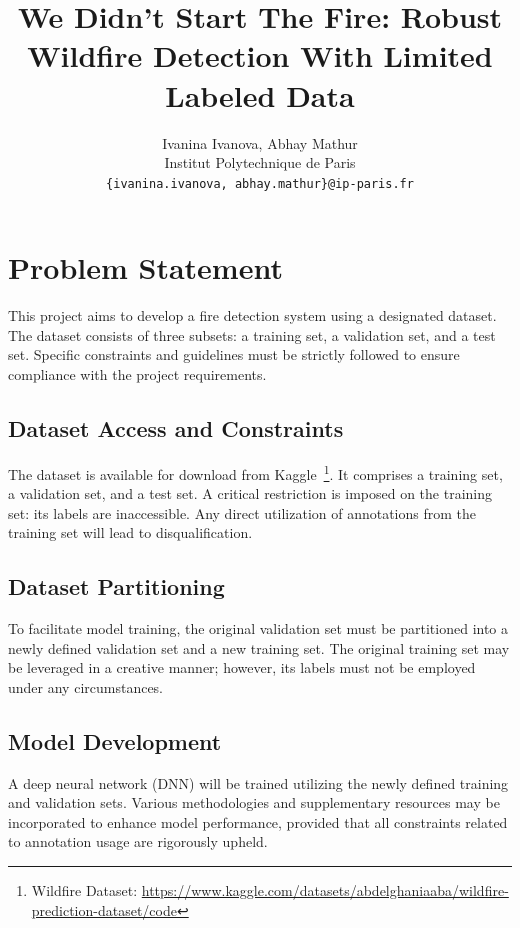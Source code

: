 \documentclass{article}
\title{We Didn't Start The Fire: Robust Wildfire Detection With Limited Labeled Data}
\author{
  Ivanina Ivanova, Abhay Mathur \\
  Institut Polytechnique de Paris \\
  \texttt{\{ivanina.ivanova, abhay.mathur\}@ip-paris.fr} \\
}
\begin{document}
\maketitle

\begin{abstract}
\end{abstract}

\section{Problem Statement}
This project aims to develop a fire detection system using a designated
dataset. The dataset consists of three subsets: a training set, a validation
set, and a test set. Specific constraints and guidelines must be strictly
followed to ensure compliance with the project requirements.

\subsection{Dataset Access and Constraints}

The dataset is available for download from Kaggle~\footnote{Wildfire Dataset:
  \url{https://www.kaggle.com/datasets/abdelghaniaaba/wildfire-prediction-dataset/code}}.
It comprises a training set, a validation set, and a test set. A critical
restriction is imposed on the training set: its labels are inaccessible. Any
direct utilization of annotations from the training set will lead to
disqualification.

\subsection{Dataset Partitioning}

To facilitate model training, the original validation set must be partitioned
into a newly defined validation set and a new training set. The original
training set may be leveraged in a creative manner; however, its labels must
not be employed under any circumstances.

\subsection{Model Development}

A deep neural network (DNN) will be trained utilizing the newly defined
training and validation sets. Various methodologies and supplementary resources
may be incorporated to enhance model performance, provided that all constraints
related to annotation usage are rigorously upheld.
\end{document}
